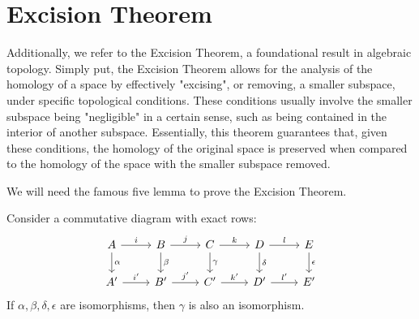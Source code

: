 \section{Excision Theorem}
\label{ExcisionTheorem}
Additionally, we refer to the Excision Theorem, a foundational result in
algebraic topology. Simply put, the Excision Theorem allows for the analysis of
the homology of a space by effectively "excising", or removing, a smaller
subspace, under specific topological conditions. These conditions usually
involve the smaller subspace being "negligible" in a certain sense, such as being
contained in the interior of another subspace. Essentially, this theorem guarantees
that, given these conditions, the homology of the original space is preserved when
compared to the homology of the space with the smaller subspace removed.

We will need the famous five lemma to prove the Excision Theorem.

\begin{lemma}{\cite[p.120]{hatcher2005algebraic}}
	\label{fivelemma} Consider a commutative diagram with exact rows:
	\begin{equation}
		\begin{tikzcd}
			A \arrow[r, "i"] \arrow[d, "\alpha"] & B \arrow[r, "j"] \arrow[d, "\beta"]
			& C \arrow[r, "k"] \arrow[d, "\gamma"] & D \arrow[r, "l"] \arrow[d, "\delta"]
			& E \arrow[d, "\epsilon"] \\ A' \arrow[r, "i'"] & B' \arrow[r, "j'"] & C'
			\arrow[r, "k'"] & D' \arrow[r, "l'"] & E'
		\end{tikzcd}
	\end{equation}
	If $\alpha, \beta, \delta, \epsilon$ are isomorphisms, then $\gamma$ is also an
	isomorphism.
\end{lemma}

